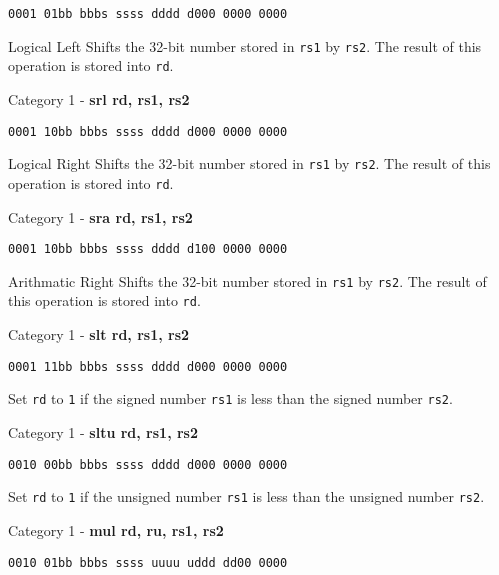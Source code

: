 \documentclass{article}
\begin{document}
\begin{flushleft}
\begin{verbatim}0001 01bb bbbs ssss dddd d000 0000 0000\end{verbatim}
Logical Left Shifts the 32-bit number stored in \verb|rs1| by \verb|rs2|.
The result of this operation is stored into \verb|rd|.
\newline\newline
\begin{large}Category 1 - \textbf{srl rd, rs1, rs2}\end{large}
\begin{verbatim}0001 10bb bbbs ssss dddd d000 0000 0000\end{verbatim}
Logical Right Shifts the 32-bit number stored in \verb|rs1| by \verb|rs2|.
The result of this operation is stored into \verb|rd|.
\newline\newline
\begin{large}Category 1 - \textbf{sra rd, rs1, rs2}\end{large}
\begin{verbatim}0001 10bb bbbs ssss dddd d100 0000 0000\end{verbatim}
Arithmatic Right Shifts the 32-bit number stored in \verb|rs1| by \verb|rs2|.
The result of this operation is stored into \verb|rd|.
\newline\newline
\begin{large}Category 1 - \textbf{slt rd, rs1, rs2}\end{large}
\begin{verbatim}0001 11bb bbbs ssss dddd d000 0000 0000\end{verbatim}
Set \verb|rd| to \verb|1| if the signed number \verb|rs1| is less than the signed number \verb|rs2|.
\newline\newline
\begin{large}Category 1 - \textbf{sltu rd, rs1, rs2}\end{large}
\begin{verbatim}0010 00bb bbbs ssss dddd d000 0000 0000\end{verbatim}
Set \verb|rd| to \verb|1| if the unsigned number \verb|rs1| is less than the unsigned number \verb|rs2|.
\newline\newline
\begin{large}Category 1 - \textbf{mul rd, ru, rs1, rs2}\end{large}
\begin{verbatim}0010 01bb bbbs ssss uuuu uddd dd00 0000\end{verbatim}

\end{flushleft}
\end{document}
